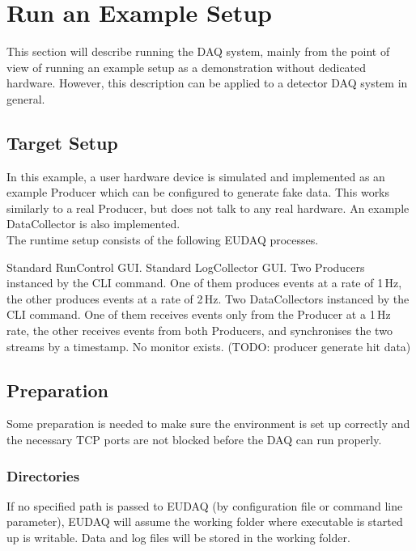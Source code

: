 \section{Run an Example Setup}
This section will describe running the DAQ system, mainly from the point of view of running an example setup as a demonstration without dedicated hardware.
However, this description can be applied to a detector DAQ system in general.

\subsection{Target Setup}
In this example, a user hardware device is simulated and implemented as an example Producer which can be configured to generate fake data. This works similarly to a real Producer, but does not talk to any real hardware. An example DataCollector is also implemented. \\
The runtime setup consists of the following EUDAQ processes.
\begin{description}
Standard RunControl GUI.
Standard LogCollector GUI.
Two Producers instanced by the CLI command. One of them produces events at a rate of 1\,Hz, the other produces events at a rate of 2\,Hz.
Two DataCollectors instanced by the CLI command. One of them receives events only from the Producer at a 1\,Hz rate, the other receives events from both Producers, and synchronises the two streams by a timestamp.
No monitor exists. (TODO: producer generate hit data)
\end{description}

\subsection{Preparation}
Some preparation is needed to make sure the environment is set up correctly and
the necessary TCP ports are not blocked before the DAQ can run properly.

\subsubsection{Directories}
If no specified path is passed to EUDAQ (by configuration file or command line parameter), EUDAQ will assume the working folder where executable is started up  is writable. Data and log files will be stored in the working folder.

